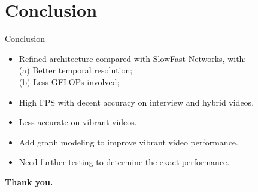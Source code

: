 \documentclass[aspectratio=43,display]{beamer}
\begin{document}
	\section{Conclusion}

		\begin{frame}{Conclusion}

			\begin{itemize}
				\item Refined architecture compared with SlowFast Networks, with:\\
				(a) Better temporal resolution; \\
				(b) Less GFLOPs involved; \\
				\item High FPS with decent accuracy on interview and hybrid videos.
			\end{itemize}

			\vskip 0.5cm

			\begin{itemize}
				\item Less accurate on vibrant videos.
				\item Add graph modeling to improve vibrant video performance.
				\item Need further testing to determine the exact performance.
			\end{itemize}

		\end{frame}

		\begin{frame}

			\center
			\textbf{Thank you.}

		\end{frame}
\end{document}
